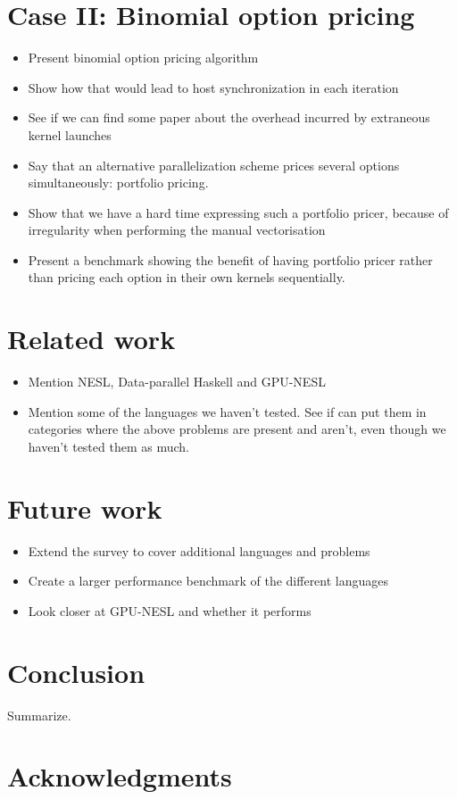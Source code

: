 \documentclass{llncs2e/llncs}
\begin{document}
\section{Case II: Binomial option pricing}
\begin{itemize}
\item Present binomial option pricing algorithm
\item Show how that would lead to host synchronization in each iteration
\item See if we can find some paper about the overhead incurred by
  extraneous kernel launches
\item Say that an alternative parallelization scheme prices several
  options simultaneously: portfolio pricing.
\item Show that we have a hard time expressing such a portfolio
  pricer, because of irregularity when performing the manual
  vectorisation
\item Present a benchmark showing the benefit of having portfolio
  pricer rather than pricing each option in their own kernels
  sequentially.
\end{itemize}

\section{Related work}
\begin{itemize}
\item Mention NESL, Data-parallel Haskell and GPU-NESL
\item Mention some of the languages we haven't tested. See if can put
  them in categories where the above problems are present and aren't,
  even though we haven't tested them as much.
\end{itemize}

\section{Future work}
\begin{itemize}
\item Extend the survey to cover additional languages and problems
\item Create a larger performance benchmark of the different languages
\item Look closer at GPU-NESL and whether it performs
\end{itemize}

\section{Conclusion}
Summarize.

\section{Acknowledgments}

 

\end{document}
